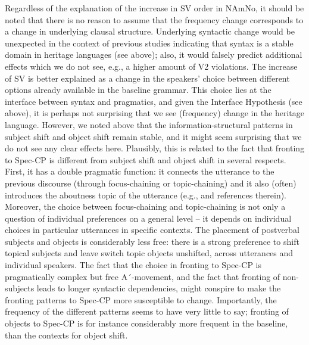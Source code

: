 \documentclass[output=paper]{langscibook}
\begin{document}
Regardless of the explanation of the increase in SV order in NAmNo, it should be noted that there is no reason to assume that the frequency change corresponds to a change in underlying clausal structure. Underlying syntactic change would be unexpected in the context of previous studies indicating that syntax is a stable domain in heritage languages (see  above); also, it would falsely predict additional effects which we do not see, e.g., a higher amount of V2 violations. The increase of SV is better explained as a change in the speakers’ choice between different options already available in the baseline grammar. This choice lies at the interface between syntax and pragmatics, and given the Interface Hypothesis (see above), it is perhaps not surprising that we see (frequency) change in the heritage language. However, we noted above that the information-structural patterns in subject shift and object shift remain stable, and it might seem surprising that we do not see any clear effects here. Plausibly, this is related to the fact that fronting to Spec-CP is different from subject shift and object shift in several respects. First, it has a double pragmatic function: it connects the utterance to the previous discourse (through focus-chaining or topic-chaining) and it also (often) introduces the aboutness topic of the utterance (e.g., \citealt{LindahlEngdahl2022} and references therein). Moreover, the choice between focus-chaining and topic-chaining is not only a question of individual preferences on a general level – it depends on individual choices in particular utterances in specific contexts. The placement of postverbal subjects and objects is considerably less free: there is a strong preference to shift topical subjects and leave switch topic objects unshifted, across utterances and individual speakers. The fact that the choice in fronting to Spec-CP is pragmatically complex but free A´-movement, and the fact that fronting of non-subjects leads to longer syntactic dependencies, might conspire to make the fronting patterns to Spec-CP more susceptible to change. Importantly, the frequency of the different patterns seems to have very little to say; fronting of objects to Spec-CP is for instance considerably more frequent in the baseline, than the contexts for object shift.  
\end{document}
